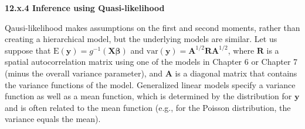\documentclass[12pt, titlepage]{article}
\begin{document}

{\large \flushleft \textbf{12.x.4 Inference using Quasi-likelihood}}

Qausi-likelihood makes assumptions on the first and second moments, rather than creating a hierarchical model, but the underlying models are similar.  Let us suppose that $\textrm{E}(\mathbf{y}) = g^{-1}(\mathbf{\mathbf{X}\boldsymbol{\beta}})$ and $\textrm{var}(\mathbf{y}) = \mathbf{A}^{1/2}\mathbf{R}\mathbf{A}^{1/2}$, where $\mathbf{R}$ is a spatial autocorrelation matrix using one of the models in Chapter 6 or Chapter 7 (minus the overall variance parameter), and $\mathbf{A}$ is a diagonal matrix that contains the variance functions of the model.  Generalized linear models specify a variance function as well as a mean function, which is determined by the distribution for $\mathbf{y}$ and is often related to the mean function (e.g., for the Poisson distribution, the variance equals the mean).  
\end{document}
